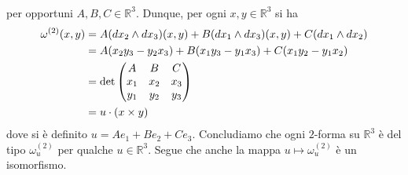 \documentclass[oneside, 11pt]{amsbook}
\makeatletter
\newcommand{\0}{{(0)}}
\newcommand{\3}{{(3)}}
\theoremstyle{colonplain}
\theoremstyle{colondefinition}
\theoremstyle{colonremark}
\numberwithin{equation}{chapter}
\renewcommand{\proofname}{Dimostrazione}
\renewenvironment{proof}[1][\proofname]{\par
  \pushQED{\qed}%
  \normalfont \topsep6\p@\@plus6\p@\relax
  \trivlist
  \item[\hskip\labelsep\bfseries #1:]\ignorespaces
}{%
  \popQED\endtrivlist\@endpefalse
}
\makeatother
\begin{document}
\begin{proof}
\begin{align}
\end{align}
per opportuni $A, B, C \in \mathbb{R}^3$. Dunque, per ogni $x, y \in \mathbb{R}^3$ si ha 
\begin{align}
    \omega^{(2)}(x, y) &= A(dx_2 \wedge dx_3)(x, y) + B(dx_1 \wedge dx_3)(x, y) + C(dx_1 \wedge dx_2) \notag \\
    &= A(x_2y_3 - y_2x_3) + B(x_1y_3 - y_1x_3) + C(x_1y_2 - y_1x_2) \notag \\
    &= \det\begin{pmatrix}
        A & B & C \\
        x_1 & x_2 & x_3 \\
        y_1 & y_2 & y_3
    \end{pmatrix} \notag \\
    &= u \cdot (x \times y)
\end{align}
dove si è definito $u = Ae_1 + Be_2 + Ce_3$. Concludiamo che ogni $2$-forma su $\mathbb{R}^3$ è del tipo $\omega^{(2)}_u$ per qualche $u \in \mathbb{R}^3$. Segue che anche la mappa $u \mapsto \omega^{(2)}_u$ è un isomorfismo.
\end{proof}
\end{document}
